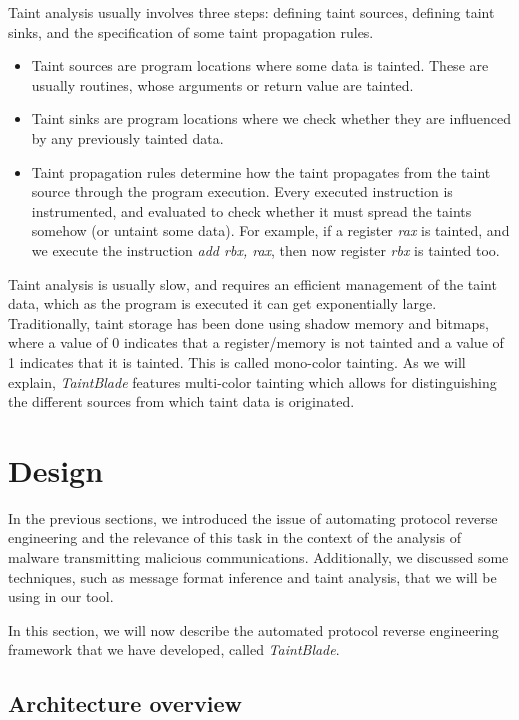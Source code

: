 \documentclass[conference]{IEEEtran}
\begin{document}
Taint analysis usually involves three steps: defining taint sources, defining
taint sinks, and the specification of some taint propagation rules.
\begin{itemize}
    \item Taint sources are program locations where some data is tainted. These are
          usually routines, whose arguments or return value are tainted.
    \item Taint sinks are program locations where we check whether they are influenced by
          any previously tainted data.
    \item Taint propagation rules determine how the taint propagates from the taint
          source through the program execution. Every executed instruction is
          instrumented, and evaluated to check whether it must spread the taints somehow
          (or untaint some data). For example, if a register \textit{rax} is tainted, and
          we execute the instruction \textit{add rbx, rax}, then now register
          \textit{rbx} is tainted too.
\end{itemize}

Taint analysis is usually slow, and requires an efficient management of the
taint data, which as the program is executed it can get exponentially large.
Traditionally, taint storage has been done using shadow memory and bitmaps,
where a value of 0 indicates that a register/memory is not tainted and a value
of 1 indicates that it is tainted. This is called mono-color tainting. As we
will explain, \textit{TaintBlade} features multi-color tainting which allows
for distinguishing the different sources from which taint data is originated.

\section{Design} \label{sec:design}
In the previous sections, we introduced the issue of automating protocol
reverse engineering and the relevance of this task in the context of the
analysis of malware transmitting malicious communications. Additionally, we
discussed some techniques, such as message format inference and taint analysis,
that we will be using in our tool.

In this section, we will now describe the automated protocol reverse
engineering framework that we have developed, called \textit{TaintBlade}.

\subsection{Architecture overview}
\end{document}
